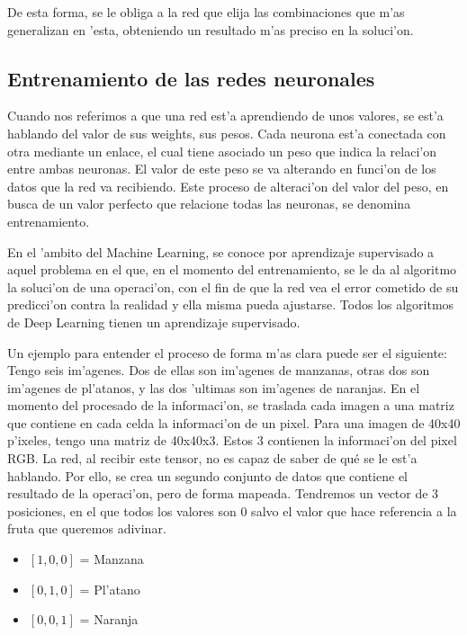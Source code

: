 
De esta forma, se le obliga a la red que elija las combinaciones que m'as generalizan en 'esta, obteniendo un resultado m'as preciso en la soluci'on.

\clearpage

\subsection{Entrenamiento de las redes neuronales}

Cuando nos referimos a que una red est'a aprendiendo de unos valores, se est'a hablando del valor de sus weights, sus pesos. Cada neurona est'a conectada con otra mediante un enlace, el cual tiene asociado un peso que indica la relaci'on entre ambas neuronas. El valor de este peso se va alterando en funci'on de los datos que la red va recibiendo.
Este proceso de alteraci'on del valor del peso, en busca de un valor perfecto que relacione todas las neuronas, se denomina entrenamiento. 

En el 'ambito del Machine Learning, se conoce por aprendizaje supervisado a aquel problema en el que, en el momento del entrenamiento, se le da al algoritmo la soluci'on de una operaci'on, con el fin de que la red vea el error cometido de su predicci'on contra la realidad y ella misma pueda ajustarse. 
Todos los algoritmos de Deep Learning tienen un aprendizaje supervisado.

Un ejemplo para entender el proceso de forma m'as clara puede ser el siguiente: Tengo seis im'agenes. Dos de ellas son im'agenes de manzanas, otras dos son im'agenes de pl'atanos, y las dos 'ultimas son im'agenes de naranjas.
En el momento del procesado de la informaci'on, se traslada cada imagen a una matriz que contiene en cada celda la informaci'on de un pixel. Para una imagen de 40x40 p'ixeles, tengo una matriz de 40x40x3. Estos 3 contienen la informaci'on del pixel RGB. 
La red, al recibir este tensor, no es capaz de saber de qué se le est'a hablando. Por ello, se crea un segundo conjunto de datos que contiene el resultado de la operaci'on, pero de forma mapeada.
Tendremos un vector de 3 posiciones, en el que todos los valores son 0 salvo el valor que hace referencia a la fruta que queremos adivinar.

\begin{itemize}
\item $ [1,0,0] $ = Manzana
\item $ [0,1,0] $ = Pl'atano
\item $ [0,0,1] $ = Naranja
\end{itemize}

